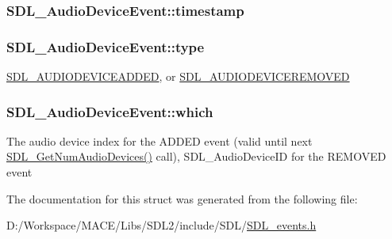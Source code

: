 \subsubsection[{\texorpdfstring{timestamp}{timestamp}}]{ S\+D\+L\+\_\+\+Audio\+Device\+Event\+::timestamp}\hypertarget{struct_s_d_l___audio_device_event_aa471680486a6103eafc9af569016df57}{}\label{struct_s_d_l___audio_device_event_aa471680486a6103eafc9af569016df57}
\subsubsection[{\texorpdfstring{type}{type}}]{ S\+D\+L\+\_\+\+Audio\+Device\+Event\+::type}\hypertarget{struct_s_d_l___audio_device_event_ae68c3bd49b49608711a17395c7cbfe58}{}\label{struct_s_d_l___audio_device_event_ae68c3bd49b49608711a17395c7cbfe58}
\hyperlink{_s_d_l__events_8h_a3b589e89be6b35c02e0dd34a55f3fccaadb3154654baf003910e75d74b507a82b}{S\+D\+L\+\_\+\+A\+U\+D\+I\+O\+D\+E\+V\+I\+C\+E\+A\+D\+D\+ED}, or \hyperlink{_s_d_l__events_8h_a3b589e89be6b35c02e0dd34a55f3fccaad56f8934fe24ee4c0cd9329e3c57c0c2}{S\+D\+L\+\_\+\+A\+U\+D\+I\+O\+D\+E\+V\+I\+C\+E\+R\+E\+M\+O\+V\+ED} 
\subsubsection[{\texorpdfstring{which}{which}}]{ S\+D\+L\+\_\+\+Audio\+Device\+Event\+::which}\hypertarget{struct_s_d_l___audio_device_event_ac91d70fd4e1dd596185fed061388896c}{}\label{struct_s_d_l___audio_device_event_ac91d70fd4e1dd596185fed061388896c}
The audio device index for the A\+D\+D\+ED event (valid until next \hyperlink{_s_d_l__audio_8h_ae165f64b3f0fecfebe1c97731600ca59}{S\+D\+L\+\_\+\+Get\+Num\+Audio\+Devices()} call), S\+D\+L\+\_\+\+Audio\+Device\+ID for the R\+E\+M\+O\+V\+ED event 

The documentation for this struct was generated from the following file\+:\begin{DoxyCompactItemize}
\item 
D\+:/\+Workspace/\+M\+A\+C\+E/\+Libs/\+S\+D\+L2/include/\+S\+D\+L/\hyperlink{_s_d_l__events_8h}{S\+D\+L\+\_\+events.\+h}\end{DoxyCompactItemize}
